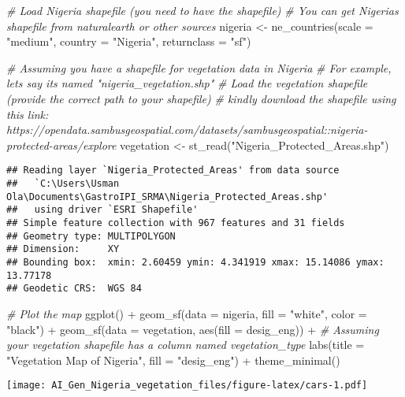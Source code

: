 \documentclass[
]{article}
\newenvironment{Shaded}{\begin{snugshade}}{\end{snugshade}}
\newcommand{\AttributeTok}[1]{\textcolor[rgb]{0.77,0.63,0.00}{#1}}
\newcommand{\CommentTok}[1]{\textcolor[rgb]{0.56,0.35,0.01}{\textit{#1}}}
\newcommand{\FunctionTok}[1]{\textcolor[rgb]{0.00,0.00,0.00}{#1}}
\newcommand{\NormalTok}[1]{#1}
\newcommand{\OtherTok}[1]{\textcolor[rgb]{0.56,0.35,0.01}{#1}}
\newcommand{\SpecialCharTok}[1]{\textcolor[rgb]{0.00,0.00,0.00}{#1}}
\newcommand{\StringTok}[1]{\textcolor[rgb]{0.31,0.60,0.02}{#1}}
\begin{document}
\begin{Shaded}
\begin{Highlighting}[]
\CommentTok{\# Load Nigeria shapefile (you need to have the shapefile)}
\CommentTok{\# You can get Nigeria\textquotesingle{}s shapefile from naturalearth or other sources}
\NormalTok{nigeria }\OtherTok{\textless{}{-}} \FunctionTok{ne\_countries}\NormalTok{(}\AttributeTok{scale =} \StringTok{"medium"}\NormalTok{, }\AttributeTok{country =} \StringTok{"Nigeria"}\NormalTok{, }\AttributeTok{returnclass =} \StringTok{"sf"}\NormalTok{)}

\CommentTok{\# Assuming you have a shapefile for vegetation data in Nigeria}
\CommentTok{\# For example, let\textquotesingle{}s say it\textquotesingle{}s named "nigeria\_vegetation.shp"}
\CommentTok{\# Load the vegetation shapefile (provide the correct path to your shapefile)}
\CommentTok{\# kindly download the shapefile using this link: https://opendata.sambusgeospatial.com/datasets/sambusgeospatial::nigeria{-}protected{-}areas/explore}
\NormalTok{vegetation }\OtherTok{\textless{}{-}} \FunctionTok{st\_read}\NormalTok{(}\StringTok{"Nigeria\_Protected\_Areas.shp"}\NormalTok{)}
\end{Highlighting}
\end{Shaded}

\begin{verbatim}
## Reading layer `Nigeria_Protected_Areas' from data source 
##   `C:\Users\Usman Ola\Documents\GastroIPI_SRMA\Nigeria_Protected_Areas.shp' 
##   using driver `ESRI Shapefile'
## Simple feature collection with 967 features and 31 fields
## Geometry type: MULTIPOLYGON
## Dimension:     XY
## Bounding box:  xmin: 2.60459 ymin: 4.341919 xmax: 15.14086 ymax: 13.77178
## Geodetic CRS:  WGS 84
\end{verbatim}

\begin{Shaded}
\begin{Highlighting}[]
\CommentTok{\# Plot the map}
\FunctionTok{ggplot}\NormalTok{() }\SpecialCharTok{+}
  \FunctionTok{geom\_sf}\NormalTok{(}\AttributeTok{data =}\NormalTok{ nigeria, }\AttributeTok{fill =} \StringTok{"white"}\NormalTok{, }\AttributeTok{color =} \StringTok{"black"}\NormalTok{) }\SpecialCharTok{+}
  \FunctionTok{geom\_sf}\NormalTok{(}\AttributeTok{data =}\NormalTok{ vegetation, }\FunctionTok{aes}\NormalTok{(}\AttributeTok{fill =}\NormalTok{ desig\_eng)) }\SpecialCharTok{+} \CommentTok{\# Assuming your vegetation shapefile has a column named \textquotesingle{}vegetation\_type\textquotesingle{}}
  \FunctionTok{labs}\NormalTok{(}\AttributeTok{title =} \StringTok{"Vegetation Map of Nigeria"}\NormalTok{,}
       \AttributeTok{fill =} \StringTok{"desig\_eng"}\NormalTok{) }\SpecialCharTok{+}
  \FunctionTok{theme\_minimal}\NormalTok{()}
\end{Highlighting}
\end{Shaded}

\texttt{[image: AI\_Gen\_Nigeria\_vegetation\_files/figure-latex/cars-1.pdf]}
\end{document}
